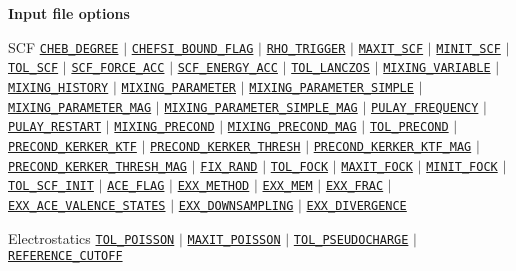 \begin{frame}[allowframebreaks]{\textbf{Input file options}}
  \begin{block}{SCF}
  \hyperlink{CHEB_DEGREE}{\texttt{CHEB\_DEGREE}} $\vert$
  \hyperlink{CHEFSI_BOUND_FLAG}{\texttt{CHEFSI\_BOUND\_FLAG}} $\vert$
  \hyperlink{RHO_TRIGGER}{\texttt{RHO\_TRIGGER}} $\vert$
  \hyperlink{MAXIT_SCF}{\texttt{MAXIT\_SCF}} $\vert$
  \hyperlink{MINIT_SCF}{\texttt{MINIT\_SCF}} $\vert$
  \hyperlink{TOL_SCF}{\texttt{TOL\_SCF}} $\vert$
  \hyperlink{SCF_FORCE_ACC}{\texttt{SCF\_FORCE\_ACC}} $\vert$
  \hyperlink{SCF_ENERGY_ACC}{\texttt{SCF\_ENERGY\_ACC}} $\vert$
  \hyperlink{TOL_LANCZOS}{\texttt{TOL\_LANCZOS}} $\vert$
  \hyperlink{MIXING_VARIABLE}{\texttt{MIXING\_VARIABLE}} $\vert$
  \hyperlink{MIXING_HISTORY}{\texttt{MIXING\_HISTORY}} $\vert$
  \hyperlink{MIXING_PARAMETER}{\texttt{MIXING\_PARAMETER}} $\vert$
  \hyperlink{MIXING_PARAMETER_SIMPLE}{\texttt{MIXING\_PARAMETER\_SIMPLE}} $\vert$
  \hyperlink{MIXING_PARAMETER_MAG}{\texttt{MIXING\_PARAMETER\_MAG}} $\vert$
  \hyperlink{MIXING_PARAMETER_SIMPLE_MAG}{\texttt{MIXING\_PARAMETER\_SIMPLE\_MAG}} $\vert$
  \hyperlink{PULAY_FREQUENCY}{\texttt{PULAY\_FREQUENCY}} $\vert$
  \hyperlink{PULAY_RESTART}{\texttt{PULAY\_RESTART}} $\vert$
  \hyperlink{MIXING_PRECOND}{\texttt{MIXING\_PRECOND}} $\vert$
  \hyperlink{MIXING_PRECOND_MAG}{\texttt{MIXING\_PRECOND\_MAG}} $\vert$
  \hyperlink{TOL_PRECOND}{\texttt{TOL\_PRECOND}} $\vert$
  \hyperlink{PRECOND_KERKER_KTF}{\texttt{PRECOND\_KERKER\_KTF}} $\vert$
  \hyperlink{PRECOND_KERKER_THRESH}{\texttt{PRECOND\_KERKER\_THRESH}} $\vert$
  \hyperlink{PRECOND_KERKER_KTF_MAG}{\texttt{PRECOND\_KERKER\_KTF\_MAG}} $\vert$
  \hyperlink{PRECOND_KERKER_THRESH_MAG}{\texttt{PRECOND\_KERKER\_THRESH\_MAG}} $\vert$
  \hyperlink{FIX_RAND}{\texttt{FIX\_RAND}} $\vert$ 
  \hyperlink{TOL_FOCK}{\texttt{TOL\_FOCK}} $\vert$ 
  \hyperlink{MAXIT_FOCK}{\texttt{MAXIT\_FOCK}} $\vert$ 
  \hyperlink{MINIT_FOCK}{\texttt{MINIT\_FOCK}} $\vert$ 
  \hyperlink{TOL_SCF_INIT}{\texttt{TOL\_SCF\_INIT}} $\vert$ 
  \hyperlink{ACE_FLAG}{\texttt{ACE\_FLAG}} $\vert$ 
  \hyperlink{EXX_METHOD}{\texttt{EXX\_METHOD}} $\vert$ 
  \hyperlink{EXX_MEM}{\texttt{EXX\_MEM}} $\vert$ 
  \hyperlink{EXX_FRAC}{\texttt{EXX\_FRAC}} $\vert$ 
  \hyperlink{EXX_ACE_VALENCE_STATES}{\texttt{EXX\_ACE\_VALENCE\_STATES}} $\vert$ 
  \hyperlink{EXX_DOWNSAMPLING}{\texttt{EXX\_DOWNSAMPLING}} $\vert$ 
  \hyperlink{EXX_DIVERGENCE}{\texttt{EXX\_DIVERGENCE}}
  \end{block}
  
  \vspace{-2mm}
  \begin{block}{Electrostatics}
  \hyperlink{TOL_POISSON}{\texttt{TOL\_POISSON}} $\vert$
  \hyperlink{MAXIT_POISSON}{\texttt{MAXIT\_POISSON}} $\vert$
  \hyperlink{TOL_PSEUDOCHARGE}{\texttt{TOL\_PSEUDOCHARGE}} $\vert$
  \hyperlink{REFERENCE_CUTOFF}{\texttt{REFERENCE\_CUTOFF}} 
  \end{block}
  

\end{frame}
